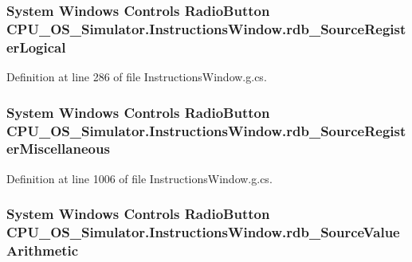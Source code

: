\subsubsection[{rdb\+\_\+\+Source\+Register\+Logical}]{\setlength{\rightskip}{0pt plus 5cm}System Windows Controls Radio\+Button C\+P\+U\+\_\+\+O\+S\+\_\+\+Simulator.\+Instructions\+Window.\+rdb\+\_\+\+Source\+Register\+Logical\hspace{0.3cm}{\ttfamily [package]}}\label{class_c_p_u___o_s___simulator_1_1_instructions_window_ab8c8622e8a96238fb88e455d60c51e78}


Definition at line 286 of file Instructions\+Window.\+g.\+cs.

\hypertarget{class_c_p_u___o_s___simulator_1_1_instructions_window_ad2b0098ef721214b53b9e3241e611a84}{}
\subsubsection[{rdb\+\_\+\+Source\+Register\+Miscellaneous}]{\setlength{\rightskip}{0pt plus 5cm}System Windows Controls Radio\+Button C\+P\+U\+\_\+\+O\+S\+\_\+\+Simulator.\+Instructions\+Window.\+rdb\+\_\+\+Source\+Register\+Miscellaneous\hspace{0.3cm}{\ttfamily [package]}}\label{class_c_p_u___o_s___simulator_1_1_instructions_window_ad2b0098ef721214b53b9e3241e611a84}


Definition at line 1006 of file Instructions\+Window.\+g.\+cs.

\hypertarget{class_c_p_u___o_s___simulator_1_1_instructions_window_a627e9cbe7e0cb2ce0f109f2345e19b73}{}
\subsubsection[{rdb\+\_\+\+Source\+Value\+Arithmetic}]{\setlength{\rightskip}{0pt plus 5cm}System Windows Controls Radio\+Button C\+P\+U\+\_\+\+O\+S\+\_\+\+Simulator.\+Instructions\+Window.\+rdb\+\_\+\+Source\+Value\+Arithmetic\hspace{0.3cm}{\ttfamily [package]}}\label{class_c_p_u___o_s___simulator_1_1_instructions_window_a627e9cbe7e0cb2ce0f109f2345e19b73}


